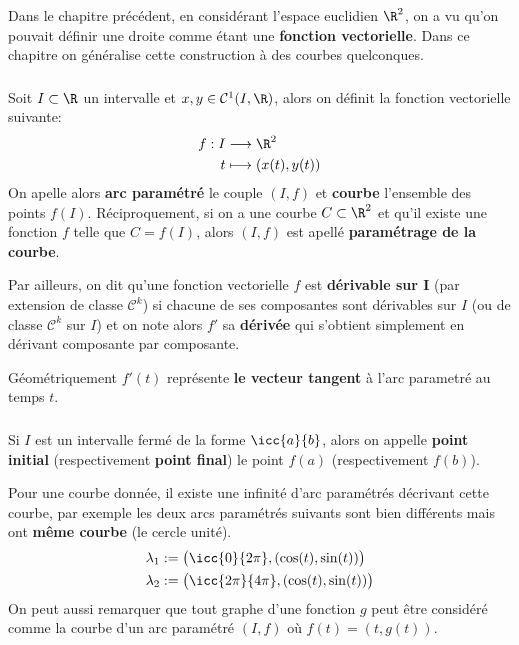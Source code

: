 \chapter*{} %

Dans le chapitre précédent, en considérant l'espace euclidien \(\R^2\), on a vu qu'on pouvait définir une droite comme étant une \textbf{fonction vectorielle}.\+
Dans ce chapitre on généralise cette construction à des courbes quelconques.

\subsection*{}
Soit \(I \subset \R\) un intervalle et \(x, y \in \mathcal{C}^1(I, \R)\), alors on définit la fonction vectorielle suivante:
\[
   \begin{aligned}
      f: I &\longrightarrow \R^2\\
      t &\longmapsto (x(t), y(t))
   \end{aligned}
\]
On apelle alors \textbf{arc paramétré} le couple \((I, f)\) et \textbf{courbe} l'ensemble des points \(f(I)\). Réciproquement, si on a une courbe \(C \subset \R^2\) et qu'il existe une fonction \(f\) telle que \(C = f(I)\), alors \((I, f)\) est apellé \textbf{paramétrage de la courbe}.\<

Par ailleurs, on dit qu'une fonction vectorielle \(f\) est \textbf{dérivable sur I} (par extension de classe \(\mathcal{C}^k\)) si chacune de ses composantes sont dérivables sur \(I\) (ou de classe \(\mathcal{C}^k\) sur \(I\)) et on note alors \(f'\) sa \textbf{dérivée} qui s'obtient simplement en dérivant composante par composante.\<

Géométriquement \(f'(t)\) représente \textbf{le vecteur tangent} à l'arc parametré au temps \(t\).

\subsection*{}
Si \(I\) est un intervalle fermé de la forme \(\icc{a}{b}\), alors on appelle \textbf{point initial} (respectivement \textbf{point final}) le point \(f(a)\) (respectivement \(f(b)\)).\<

Pour une courbe donnée, il existe une infinité d'arc paramétrés décrivant cette courbe, par exemple les deux arcs paramétrés suivants sont bien différents mais ont \textbf{même courbe} (le cercle unité).
\begin{align*}
   \lambda_1 &:= \bigl(\icc{0}{2\pi}, (\cos(t), \sin(t))\bigl) \\
   \lambda_2 &:= \bigl(\icc{2\pi}{4\pi}, (\cos(t), \sin(t))\bigl)
\end{align*}
On peut aussi remarquer que tout graphe d'une fonction \(g\) peut être considéré comme la courbe d'un arc paramétré \((I, f)\) où \(f(t) = (t, g(t))\). \<

